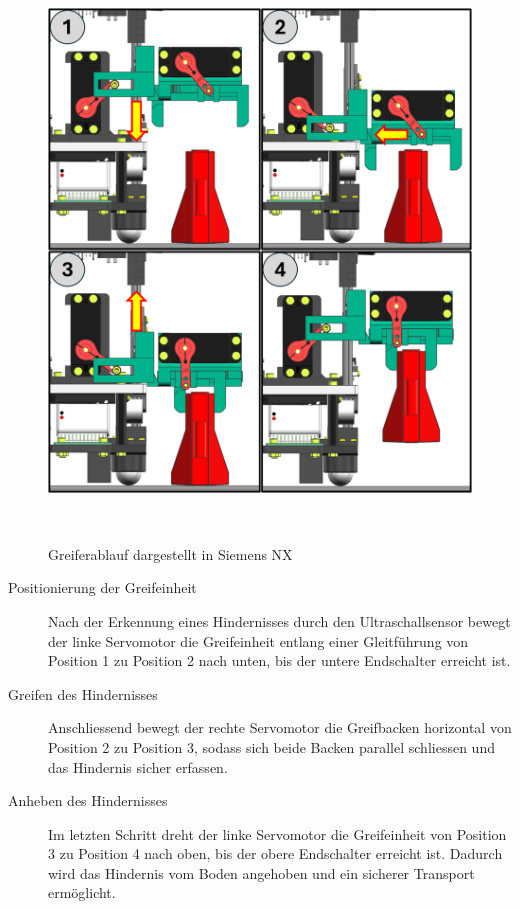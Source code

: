 \documentclass[main.tex]{subfiles} %
\begin{document}
\begin{figure}[H]
    \centering
    \includegraphics[width = 0.85\linewidth]{./fig_Mechanik/Greiferablauf_PREN2.png}
    \caption{Greiferablauf dargestellt in Siemens NX}~\label{fig:Greiferablauf}
\end{figure}


\begin{description}
    \item[Positionierung der Greifeinheit] Nach der Erkennung eines Hindernisses durch den 
        Ultraschallsensor bewegt der linke Servomotor 
        die Greifeinheit entlang einer Gleitführung von Position 1 zu Position 2 nach unten, 
        bis der untere Endschalter erreicht ist.

    \item[Greifen des Hindernisses] Anschliessend bewegt der rechte Servomotor die Greifbacken 
        horizontal von Position 2 zu Position 3, 
        sodass sich beide Backen parallel schliessen und das Hindernis sicher erfassen.

    \item[Anheben des Hindernisses] Im letzten Schritt dreht der linke Servomotor die 
        Greifeinheit von Position 3 zu Position 4 nach oben, 
        bis der obere Endschalter erreicht ist.  
        Dadurch wird das Hindernis vom Boden angehoben und ein sicherer Transport ermöglicht.

\end{description}
\end{document}

